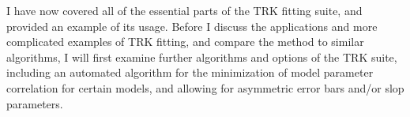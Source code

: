I have now covered all of the essential parts of the TRK fitting suite, and provided an example of its usage. Before I  discuss the applications and more complicated examples of TRK fitting, and compare the method to similar algorithms, I will first examine further algorithms and options of the TRK suite, including an automated algorithm for the minimization of model parameter correlation for certain models, and allowing for asymmetric error bars and/or slop parameters.